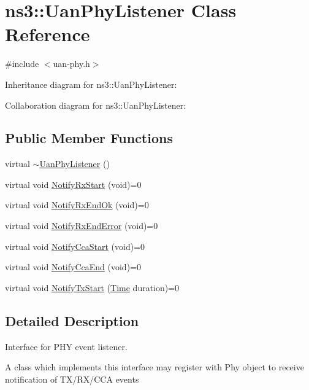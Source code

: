 \hypertarget{classns3_1_1UanPhyListener}{}\section{ns3\+:\+:Uan\+Phy\+Listener Class Reference}
\label{classns3_1_1UanPhyListener}


{\ttfamily \#include $<$uan-\/phy.\+h$>$}



Inheritance diagram for ns3\+:\+:Uan\+Phy\+Listener\+:


Collaboration diagram for ns3\+:\+:Uan\+Phy\+Listener\+:
\subsection*{Public Member Functions}
\begin{DoxyCompactItemize}
\item 
virtual \hyperlink{classns3_1_1UanPhyListener_a15215b51b6e2fe70aa9306030aba23c3}{$\sim$\+Uan\+Phy\+Listener} ()
\item 
virtual void \hyperlink{classns3_1_1UanPhyListener_a8883de6a5d45bdf5ba7bc8e02f10902c}{Notify\+Rx\+Start} (void)=0
\item 
virtual void \hyperlink{classns3_1_1UanPhyListener_a06a92545d910975f45825778f8e694d9}{Notify\+Rx\+End\+Ok} (void)=0
\item 
virtual void \hyperlink{classns3_1_1UanPhyListener_a90f9e79a83da68946915bed9bb8c3d79}{Notify\+Rx\+End\+Error} (void)=0
\item 
virtual void \hyperlink{classns3_1_1UanPhyListener_a30d7fa718b940f13d92c580936df987b}{Notify\+Cca\+Start} (void)=0
\item 
virtual void \hyperlink{classns3_1_1UanPhyListener_a4c74cc8cd4ab4d61df1481d2ae02f06e}{Notify\+Cca\+End} (void)=0
\item 
virtual void \hyperlink{classns3_1_1UanPhyListener_a9e592dd94bf711c0926788b2b2e53248}{Notify\+Tx\+Start} (\hyperlink{classns3_1_1Time}{Time} duration)=0
\end{DoxyCompactItemize}


\subsection{Detailed Description}
Interface for P\+HY event listener.

A class which implements this interface may register with Phy object to receive notification of T\+X/\+R\+X/\+C\+CA events 


